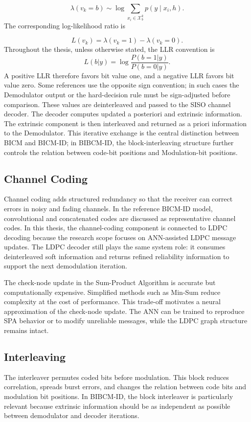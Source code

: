 \begin{equation}
\lambda(v_k=b)\sim\log\sum_{x_i\in\mathcal{X}_b^k}p(y\mid x_i,h).
\end{equation}
The corresponding log-likelihood ratio is

\begin{equation}
L(v_k)=\lambda(v_k=1)-\lambda(v_k=0).
\end{equation}
Throughout the thesis, unless otherwise stated, the LLR convention is
\begin{equation*}
L(b|y)=\log\frac{P(b=1|y)}{P(b=0|y)}.
\end{equation*}
A positive LLR therefore favors bit value one, and a negative LLR favors bit value zero. Some references use the opposite sign convention; in such cases the Demodulator output or the hard-decision rule must be sign-adjusted before comparison. These values are deinterleaved and passed to the SISO channel decoder. The decoder computes updated a posteriori and extrinsic information. The extrinsic component is then interleaved and returned as a priori information to the Demodulator. This iterative exchange is the central distinction between BICM and BICM-ID; in BIBCM-ID, the block-interleaving structure further controls the relation between code-bit positions and Modulation-bit positions.

\subsection{Channel Coding}
Channel coding adds structured redundancy so that the receiver can correct errors in noisy and fading channels. In the reference BICM-ID model, convolutional and concatenated codes are discussed as representative channel codes. In this thesis, the channel-coding component is connected to LDPC decoding because the research scope focuses on ANN-assisted LDPC message updates. The LDPC decoder still plays the same system role: it consumes deinterleaved soft information and returns refined reliability information to support the next demodulation iteration.

The check-node update in the Sum-Product Algorithm is accurate but computationally expensive. Simplified methods such as Min-Sum reduce complexity at the cost of performance. This trade-off motivates a neural approximation of the check-node update. The ANN can be trained to reproduce SPA behavior or to modify unreliable messages, while the LDPC graph structure remains intact.

\subsection{Interleaving}
The interleaver permutes coded bits before modulation. This block reduces correlation, spreads burst errors, and changes the relation between code bits and modulation bit positions. In BIBCM-ID, the block interleaver is particularly relevant because extrinsic information should be as independent as possible between demodulator and decoder iterations.

